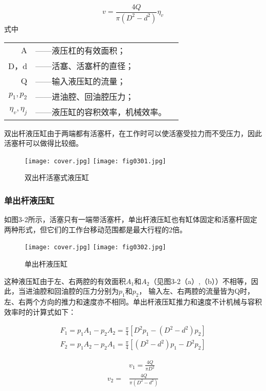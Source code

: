 

 
\begin{equation}
    v=\frac{4Q}{\pi(D^2-d^2)}\eta_v    
\end{equation}
\noindent 式中 
\begin{tabular}[t]{rll}
 A &——液压杠的有效面积；\\
 D，d&——活塞、活塞杆的直径；\\
 Q &——输入液压缸的流量；\\
 $p_1,p_2$ &——进油腔、回油腔压力；\\
 $\eta_v,\eta_j$ &——液压缸的容积效率，机械效率。
\end{tabular}

双出杆液压缸由于两端都有活塞杆，在工作时可以使活塞受拉力而不受压力，因此活塞杆可以做得比较细。
\begin{figure} [htbp]%
    \centering
    \ifOpenSource
    \texttt{[image: cover.jpg]}
    \else
    \texttt{[image: fig0301.jpg]}
    \fi
    \caption{双出杆活塞式液压缸} 
    \label{fig:fig0301}%
\end{figure}
\subsubsection {单出杆液压缸}

如图3-2所示，活塞只有一端带活塞杆，单出杆液压缸也有缸体固定和活塞杆固定两种形式，但它们的工作台移动范围都是最大行程的2倍。
\begin{figure} [htbp]
    \centering
    \ifOpenSource
    \texttt{[image: cover.jpg]}
    \else
    \texttt{[image: fig0302.jpg]}
    \fi
    \caption{单出杆液压缸} %
    \label{fig:fig0302}%
\end{figure}

这种液压缸由于左、右两腔的有效面积$A_1$和$A_2$（见图3-2（a）,（b））不相等，因此，当进油腔和回油腔的压力分别为$p_1$和$p_2$，
输入左、右两腔的流量皆为Q时，左、右两个方向的推力和速度亦不相同。单出杆液压缸推力和速度不计机械与容积效率时的计算式如下：




\begin{align}
    F_1=p_1A_1-p_2A_2=\frac {\pi}{4}[D^2p_1-(D^2-d^2)p_2]\\
    F_2=p_1A_2-p_2A_1=\frac {\pi}{4}[(D^2-d^2)p_1-D^2p_2]        
\end{align}
\newpage
    
\begin{align}
&v_1=\frac{4Q}{\pi D^2}\\
v_2=&\frac{4Q}{\pi (D^2-d^2)}
\end{align}

